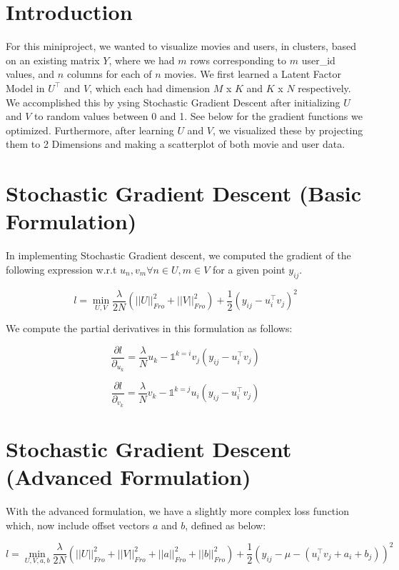 \documentclass{article}
\begin{document}
\section*{Introduction}

For this miniproject, we wanted to visualize movies and users, in clusters,
based on an existing matrix $Y$, where we had $m$ rows corresponding to $m$
user\_id values, and $n$ columns for each of $n$ movies. We first learned
a Latent Factor Model in $U^{\intercal}$ and $V$, which each had dimension
$M$ x $K$ and $K$ x $N$ respectively. We accomplished this by ysing Stochastic
Gradient Descent after initializing $U$ and $V$ to random values between 0 and 1.
See below for the gradient functions we optimized. Furthermore, after learning
$U$ and $V$, we visualized these by projecting them to 2 Dimensions and making
a scatterplot of both movie and user data.


\section*{Stochastic Gradient Descent (Basic Formulation)}

In implementing Stochastic Gradient descent, we computed the gradient
of the following expression w.r.t $u_{n}, v_{m} \forall n \in U, m \in V$
for a given point $y_{ij}$.

$$ l = \min_{U, V} \frac{\lambda}{2N} (||U||^{2}_{Fro} + ||V||^{2}_{Fro}) +
\frac{1}{2}(y_{ij} - u_{i}^{\intercal}v_{j})^{2} $$

We compute the partial derivatives in this formulation as follows:

$$ \frac{\partial l}{\partial_{u_{k}}} = \frac{\lambda}{N} u_{k} - \mathds{1}^{k = i} v_{j}(y_{ij} - u_{i}^{\intercal}v_{j}) $$


$$ \frac{\partial l}{\partial_{v_{k}}} = \frac{\lambda}{N} v_{k} - \mathds{1}^{k = j} u_{i}(y_{ij} - u_{i}^{\intercal}v_{j}) $$




\section*{Stochastic Gradient Descent (Advanced Formulation)}

With the advanced formulation, we have a slightly more complex loss function which,
now include offset vectors $a$ and $b$, defined as below:

$$ l =  \min_{U, V, a, b} \frac{\lambda}{2N} (||U||^{2}_{Fro} + ||V||^{2}_{Fro}
+ ||a||^{2}_{Fro} + ||b||^{2}_{Fro}) + \frac{1}{2} (y_{ij} - \mu - (u_{i}^{\intercal}v_{j} + a_{i} + b_{j}))^{2} $$
\end{document}
